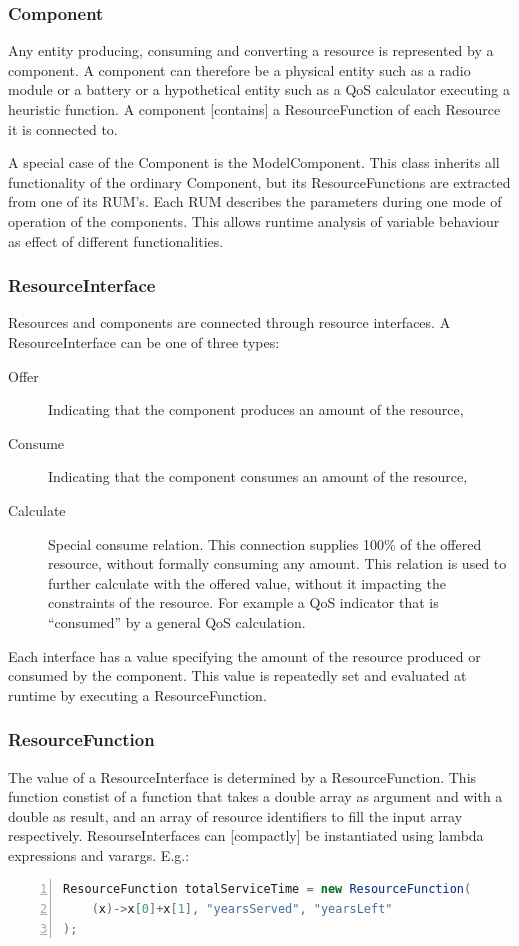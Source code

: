 \subsubsection{Component}
Any entity producing, consuming and converting a resource is represented by a component. A component can therefore be a physical entity such as a radio module or a battery or a hypothetical entity such as a QoS calculator executing a heuristic function. A component [contains] a ResourceFunction of each Resource it is connected to.

A special case of the Component is the ModelComponent. This class inherits all functionality of the ordinary Component, but its ResourceFunctions are extracted from one of its RUM's. Each RUM describes the parameters during one mode of operation of the components. This allows runtime analysis of variable behaviour as effect of different functionalities.

\subsubsection{ResourceInterface}
Resources and components are connected through resource interfaces. A ResourceInterface can be one of three types:
\begin{description}
\item[Offer] Indicating that the component produces an amount of the resource,
\item[Consume] Indicating that the component consumes an amount of the resource,
\item[Calculate] Special consume relation. This connection supplies 100\% of the offered resource, without formally consuming any amount. This relation is used to further calculate with the offered value, without it impacting the constraints of the resource. For example a QoS indicator that is ``consumed'' by a general QoS calculation.
\end{description}
Each interface has a value specifying the amount of the resource produced or consumed by the component. This value is repeatedly set and evaluated at runtime by executing a ResourceFunction.

\subsubsection{ResourceFunction}
The value of a ResourceInterface is determined by a ResourceFunction. This function constist of a function that takes a double array as argument and with a double as result, and an array of resource identifiers to fill the input array respectively. ResourseInterfaces can [compactly] be instantiated using lambda expressions and varargs. E.g.:
\begin{lstlisting}[language=java, frame=single, numbers=left, tabsize=4, basicstyle=\small]
ResourceFunction totalServiceTime = new ResourceFunction(
	(x)->x[0]+x[1], "yearsServed", "yearsLeft"
);
\end{lstlisting}

